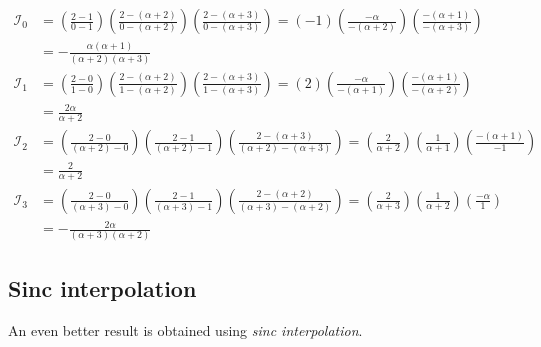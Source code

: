 \documentclass[dvipsnames]{article}
\begin{document}
\begin{align}
    \mathcal{I}_0 &= \left(\frac{2-1}{0-1}\right)\left(\frac{2-(\alpha+2)}{0-(\alpha+2)}\right)\left(\frac{2-(\alpha+3)}{0-(\alpha+3)}\right)= \left(-1\right)\left(\frac{-\alpha}{-(\alpha+2)}\right)\left(\frac{-(\alpha+1)}{-(\alpha+3)}\right)\nonumber\\
    &= -\frac{\alpha(\alpha+1)}{(\alpha+2)(\alpha+3)}\\
    \mathcal{I}_1 &= \left(\frac{2-0}{1-0}\right)\left(\frac{2-(\alpha+2)}{1-(\alpha+2)}\right)\left(\frac{2-(\alpha+3)}{1-(\alpha+3)}\right) = \left(2\right)\left(\frac{-\alpha}{-(\alpha+1)}\right)\left(\frac{-(\alpha+1)}{-(\alpha+2)}\right)\\
    &= \frac{2\alpha}{\alpha+2}\\
    \mathcal{I}_2 &= \left(\frac{2-0}{(\alpha+2)-0}\right)\left(\frac{2-1}{(\alpha+2)-1}\right)\left(\frac{2-(\alpha+3)}{(\alpha+2)-(\alpha+3)}\right) = \left(\frac{2}{\alpha+2}\right) \left(\frac{1}{\alpha+1}\right)\left(\frac{-(\alpha+1)}{-1}\right)\\
    &= \frac{2}{\alpha+2}\\
    \mathcal{I}_3 &= \left(\frac{2-0}{(\alpha+3)-0}\right)\left(\frac{2-1}{(\alpha+3)-1}\right)\left(\frac{2-(\alpha+2)}{(\alpha+3)-(\alpha+2)}\right) = \left(\frac{2}{\alpha+3}\right)\left(\frac{1}{\alpha+2}\right)\left(\frac{-\alpha}{1}\right) \\
    &= -\frac{2\alpha}{(\alpha+3)(\alpha+2)}
\end{align}

\subsection{Sinc interpolation}
An even better result is obtained using \textit{sinc interpolation}. 
\end{document}

